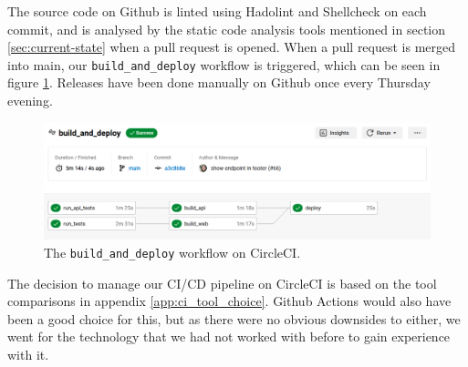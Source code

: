 The source code on Github is linted using Hadolint and Shellcheck on each commit, and is analysed by the static code analysis tools mentioned in section \ref{sec:current-state} when a pull request is opened. 
When a pull request is merged into main, our \texttt{build\_and\_deploy} workflow is triggered, which can be seen in figure \ref{fig:build_and_deploy}. 
Releases have been done manually on Github once every Thursday evening.

\begin{figure}[H]
    \centering
    \includegraphics[width=\textwidth]{images/pipeline.png}
    \caption{The \texttt{build\_and\_deploy} workflow on CircleCI.}
    \label{fig:build_and_deploy}
\end{figure}

The decision to manage our CI/CD pipeline on CircleCI is based on the tool comparisons in appendix \ref{app:ci_tool_choice}. 
Github Actions would also have been a good choice for this, but as there were no obvious downsides to either, we went for the technology that we had not worked with before to gain experience with it.






